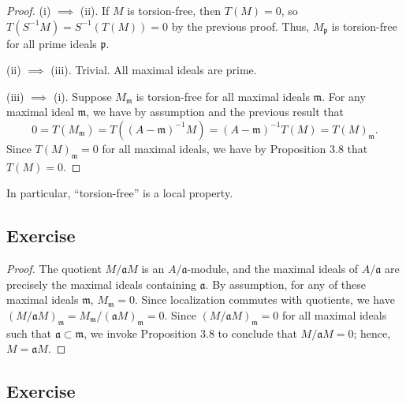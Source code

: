 \begin{proof}
(i) $\implies$ (ii). If $M$ is torsion-free, then $T(M) = 0$, so $T(S^{-1}M) = S^{-1}(T(M)) = 0$ by the previous proof. Thus, $M_{\mathfrak{p}}$ is torsion-free for all prime ideals $\mathfrak{p}$.

(ii) $\implies$ (iii). Trivial. All maximal ideals are prime.

(iii) $\implies$ (i). Suppose $M_{\mathfrak{m}}$ is torsion-free for all maximal ideals $\mathfrak{m}$. For any maximal ideal $\mathfrak{m}$, we have by assumption and the previous result that
$$0 = T(M_{\mathfrak{m}}) = T((A - \mathfrak{m})^{-1}M) = (A - \mathfrak{m})^{-1}T(M) = T(M)_{\mathfrak{m}}.$$
Since $T(M)_{\mathfrak{m}} = 0$ for all maximal ideals, we have by Proposition 3.8 that $T(M) = 0$.
\end{proof}

\begin{remark}
In particular, ``torsion-free'' is a local property.
\end{remark}

\subsection{Exercise}\label{3.14}

\begin{proof}
The quotient $M/\mathfrak{a}M$ is an $A/\mathfrak{a}$-module, and the maximal ideals of $A/\mathfrak{a}$ are precisely the maximal ideals containing $\mathfrak{a}$. By assumption, for any of these 
maximal ideals $\mathfrak{m}$, $M_{\mathfrak{m}} = 0$. Since localization commutes with quotients, we have $(M/\mathfrak{a}M)_{\mathfrak{m}} = M_{\mathfrak{m}}/(\mathfrak{a}M)_{\mathfrak{m}} = 0$.
Since $(M/\mathfrak{a}M)_{\mathfrak{m}} = 0$ for all maximal ideals such that $\mathfrak{a} \subset \mathfrak{m}$, we invoke Proposition 3.8 to conclude that $M/\mathfrak{a}M = 0$; hence, $M = \mathfrak{a}M$.
\end{proof}

\subsection{Exercise}\label{3.15}

